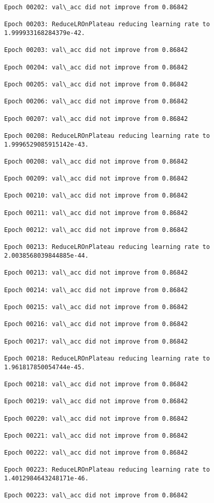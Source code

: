\documentclass[11pt]{article}
\begin{document}
\begin{Verbatim}[commandchars=\\\{\}]
Epoch 00202: val\_acc did not improve from 0.86842

Epoch 00203: ReduceLROnPlateau reducing learning rate to 1.999933168284379e-42.

Epoch 00203: val\_acc did not improve from 0.86842

Epoch 00204: val\_acc did not improve from 0.86842

Epoch 00205: val\_acc did not improve from 0.86842

Epoch 00206: val\_acc did not improve from 0.86842

Epoch 00207: val\_acc did not improve from 0.86842

Epoch 00208: ReduceLROnPlateau reducing learning rate to 1.9996529085915142e-43.

Epoch 00208: val\_acc did not improve from 0.86842

Epoch 00209: val\_acc did not improve from 0.86842

Epoch 00210: val\_acc did not improve from 0.86842

Epoch 00211: val\_acc did not improve from 0.86842

Epoch 00212: val\_acc did not improve from 0.86842

Epoch 00213: ReduceLROnPlateau reducing learning rate to 2.0038568039844885e-44.

Epoch 00213: val\_acc did not improve from 0.86842

Epoch 00214: val\_acc did not improve from 0.86842

Epoch 00215: val\_acc did not improve from 0.86842

Epoch 00216: val\_acc did not improve from 0.86842

Epoch 00217: val\_acc did not improve from 0.86842

Epoch 00218: ReduceLROnPlateau reducing learning rate to 1.961817850054744e-45.

Epoch 00218: val\_acc did not improve from 0.86842

Epoch 00219: val\_acc did not improve from 0.86842

Epoch 00220: val\_acc did not improve from 0.86842

Epoch 00221: val\_acc did not improve from 0.86842

Epoch 00222: val\_acc did not improve from 0.86842

Epoch 00223: ReduceLROnPlateau reducing learning rate to 1.4012984643248171e-46.

Epoch 00223: val\_acc did not improve from 0.86842


\end{Verbatim}
\end{document}
